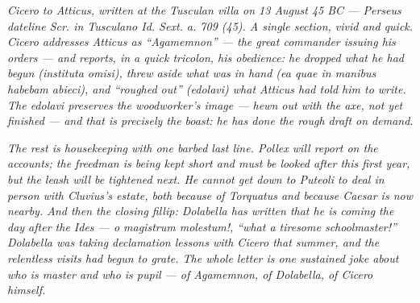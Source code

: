 
\textit{Cicero to Atticus, written at the Tusculan villa on 13
August 45 BC --- Perseus dateline \textit{Scr. in Tusculano Id.
Sext. a. 709 (45)}. A single section, vivid and quick. Cicero
addresses Atticus as ``Agamemnon'' --- the great commander
issuing his orders --- and reports, in a quick tricolon, his
obedience: he dropped what he had begun (\textit{instituta
omisi}), threw aside what was in hand (\textit{ea quae in
manibus habebam abieci}), and ``roughed out'' (\textit{edolavi})
what Atticus had told him to write. The \textit{edolavi}
preserves the woodworker's image --- hewn out with the axe, not
yet finished --- and that is precisely the boast: he has done
the rough draft on demand.}

\textit{The rest is housekeeping with one barbed last line. Pollex
will report on the accounts; the freedman is being kept short and
must be looked after this first year, but the leash will be
tightened next. He cannot get down to Puteoli to deal in person
with Cluvius's estate, both because of Torquatus and because
Caesar is now nearby. And then the closing fillip: Dolabella has
written that he is coming the day after the Ides ---
\textit{o magistrum molestum!}, ``what a tiresome schoolmaster!''
Dolabella was taking declamation lessons with Cicero that summer,
and the relentless visits had begun to grate. The whole letter
is one sustained joke about who is master and who is pupil --- of
Agamemnon, of Dolabella, of Cicero himself.}
